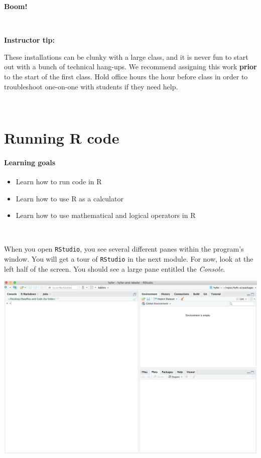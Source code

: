 \documentclass[
]{book}
\providecommand{\tightlist}{%
  \setlength{\itemsep}{0pt}\setlength{\parskip}{0pt}}
\begin{document}
\textbf{Boom!}

~

\leavevmode\hypertarget{tip-text}{}%
\textbf{Instructor tip:}

These installations can be clunky with a large class, and it is never fun to start out with a bunch of technical hang-ups. We recommend assigning this work \textbf{prior} to the start of the first class. Hold office hours the hour before class in order to troubleshoot one-on-one with students if they need help.

~

\hypertarget{running-r-code}{%
\chapter{Running R code}\label{running-r-code}}

\hypertarget{learning-goals}{%
\subsubsection*{Learning goals}\label{learning-goals}}

\begin{itemize}
\tightlist
\item
  Learn how to run code in R
\item
  Learn how to use R as a calculator
\item
  Learn how to use mathematical and logical operators in R
\end{itemize}

~

When you open \texttt{RStudio}, you see several different panes within the program's window. You will get a tour of \texttt{RStudio} in the next module. For now, look at the left half of the screen. You should see a large pane entitled the \emph{Console}.

\includegraphics{img/rstudio_firstopen.png}
\end{document}
